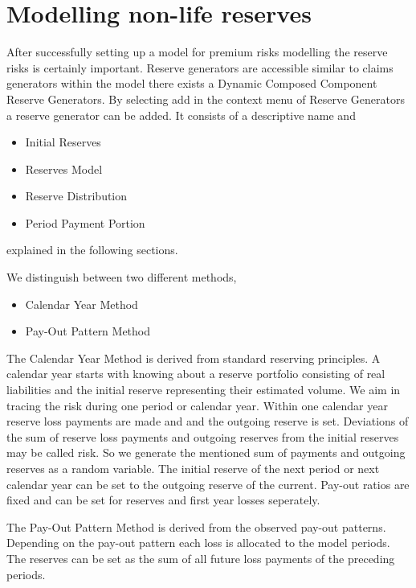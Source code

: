 \chapter{Modelling non-life reserves}
\label{chap:nl-reserves}
After successfully setting up a model for premium risks modelling the reserve risks is certainly important. Reserve generators are accessible similar to claims generators \eg within the \PODRA{} model there exists a Dynamic Composed Component Reserve Generators. By selecting add in the context menu of Reserve Generators a reserve generator can be added. It consists of a descriptive name and
\begin{itemize}
	\item Initial Reserves
	\item Reserves Model
	\item Reserve Distribution
	\item Period Payment Portion
\end{itemize}
explained in the following sections.

We distinguish between two different methods, 
\begin{itemize}
	\item Calendar Year Method
	\item Pay-Out Pattern Method
\end{itemize}

The Calendar Year Method is derived from standard reserving principles. A calendar year starts with knowing about a reserve portfolio consisting of real liabilities and the initial reserve representing their estimated volume. We aim in tracing the risk during one period or calendar year.   Within one calendar year reserve loss payments are made and and the outgoing reserve is set. Deviations of the sum of reserve loss payments and outgoing reserves from the initial reserves may be called risk. So we generate the mentioned sum of payments and outgoing reserves as a random variable. The initial reserve of the next period or next calendar year can be set to the outgoing reserve of the current. Pay-out ratios are fixed and can be set for reserves and first year losses seperately.

The Pay-Out Pattern Method is derived from the observed pay-out patterns. Depending on the pay-out pattern each loss is allocated to the model periods. The reserves can be set as the sum of all future loss payments of the preceding periods. 


